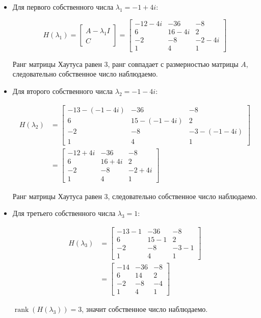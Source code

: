 \documentclass[a4paper,12pt]{article}
\begin{document}
\begin{itemize}
	
	\item Для первого собственного числа $\lambda_1 = -1 + 4i$:
	
	\[
	H(\lambda_1)=
	\begin{bmatrix}
		A-\lambda_1 I \\
		C
	\end{bmatrix}
	=
	\begin{bmatrix}
		-12-4i & -36 & -8 \\
		6 & 16-4i & 2 \\
		-2 & -8 & -2-4i \\
		1 & 4 & 1
	\end{bmatrix}
	\]
	
	Ранг матрицы Хаутуса равен 3, ранг совпадает с размерностью матрицы $A$, следовательно собственное число наблюдаемо.
	
	\item Для второго собственного числа $\lambda_2 = -1 - 4i$:
	
	\[
	\begin{aligned}
		H(\lambda_2) &=
		\begin{bmatrix}
			-13-(-1 - 4i) & -36 & -8 \\
			6 & 15-(-1 - 4i) & 2 \\
			-2 & -8 & -3-(-1 - 4i) \\
			1 & 4 & 1
		\end{bmatrix} \\[8pt]
		&=
		\begin{bmatrix}
			-12 + 4i & -36 & -8 \\
			6 & 16 + 4i & 2 \\
			-2 & -8 & -2 + 4i \\
			1 & 4 & 1
		\end{bmatrix}
	\end{aligned}
	\]
	
	Ранг матрицы Хаутуса равен 3, следовательно собственное число наблюдаемо.
	
	\item Для третьего собственного числа $\lambda_3 = 1$:
	
	\[
	\begin{aligned}
		H(\lambda_3) &=
		\begin{bmatrix}
			-13-1 & -36 & -8 \\
			6 & 15-1 & 2 \\
			-2 & -8 & -3-1 \\
			1 & 4 & 1
		\end{bmatrix} \\[8pt]
		&=
		\begin{bmatrix}
			-14 & -36 & -8 \\
			6 & 14 & 2 \\
			-2 & -8 & -4 \\
			1 & 4 & 1
		\end{bmatrix}
	\end{aligned}
	\]
	
	$\operatorname{rank}(H(\lambda_3)) = 3$, значит собственное число наблюдаемо.
	
\end{itemize}
\end{document}
